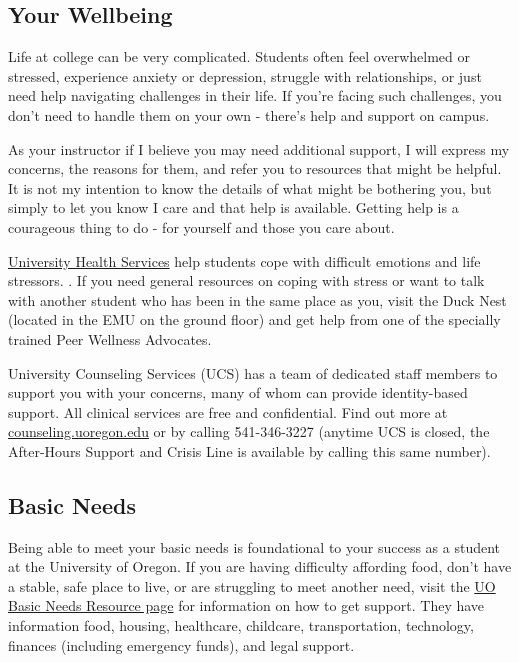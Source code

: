 \documentclass[
  letterpaper,
  DIV=11,
  numbers=noendperiod]{scrartcl}
\begin{document}
\hypertarget{your-wellbeing}{%
\subsection{Your Wellbeing}\label{your-wellbeing}}

Life at college can be very complicated. Students often feel overwhelmed
or stressed, experience anxiety or depression, struggle with
relationships, or just need help navigating challenges in their life. If
you're facing such challenges, you don't need to handle them on your own
- there's help and support on campus.

As your instructor if I believe you may need additional support, I will
express my concerns, the reasons for them, and refer you to resources
that might be helpful. It is not my intention to know the details of
what might be bothering you, but simply to let you know I care and that
help is available. Getting help is a courageous thing to do - for
yourself and those you care about.

\href{https://health.uoregon.edu/ducknest}{University Health Services}
help students cope with difficult emotions and life stressors. . If you
need general resources on coping with stress or want to talk with
another student who has been in the same place as you, visit the Duck
Nest (located in the EMU on the ground floor) and get help from one of
the specially trained Peer Wellness Advocates.

University Counseling Services (UCS) has a team of dedicated staff
members to support you with your concerns, many of whom can provide
identity-based support. All clinical services are free and confidential.
Find out more at
\href{https://counseling.uoregon.edu/}{counseling.uoregon.edu} or by
calling 541-346-3227 (anytime UCS is closed, the After-Hours Support and
Crisis Line is available by calling this same number).

\hypertarget{basic-needs}{%
\subsection{Basic Needs}\label{basic-needs}}

Being able to meet your basic needs is foundational to your success as a
student at the University of Oregon. If you are having difficulty
affording food, don't have a stable, safe place to live, or are
struggling to meet another need, visit the
\href{https://blogs.uoregon.edu/basicneeds}{UO Basic Needs Resource
page} for information on how to get support. They have information food,
housing, healthcare, childcare, transportation, technology, finances
(including emergency funds), and legal support.
\end{document}
